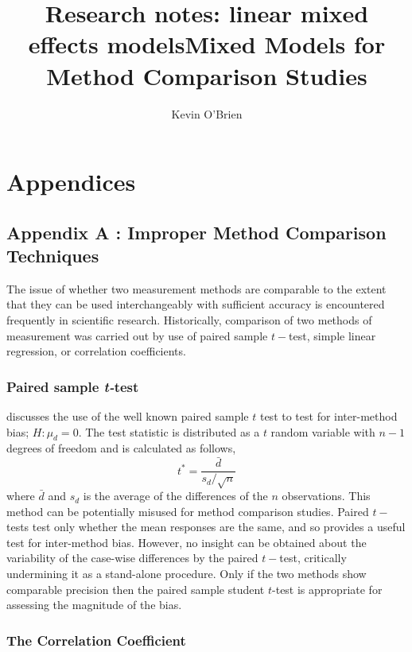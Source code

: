 \documentclass[12pt, a4paper]{report}
\title{Research notes: linear mixed effects models}
\author{ } \date{ }
\theoremstyle{plain}
\theoremstyle{definition}
\theoremstyle{remark}
\begin{document}
	\author{Kevin O'Brien}
	\title{Mixed Models for Method Comparison Studies}
	\tableofcontents
	
\chapter{Appendices}
\section{Appendix A : Improper Method Comparison Techniques}
	The issue of whether two measurement methods are comparable to the extent that they can be used interchangeably with sufficient accuracy is encountered frequently in scientific research. Historically, comparison of two methods of measurement was carried
	out by use of paired sample $t-$test, 
	simple linear regression, or correlation coefficients. 
	
	
	\subsection*{Paired sample \emph{t-}test}
	\citet{Bartko} discusses the use of the well known paired sample $t$ test to test for inter-method bias; $H: \mu_{d}=0$. The test
	statistic is distributed as a $t$ random variable with $n-1$ degrees of freedom and is calculated as follows,
	\begin{equation}
	t^{*} = \frac{\bar{d}}{ s_d/\sqrt{n}}
	\end{equation}
	where $\bar{d}$ and $s_{d}$ is the average of the differences of the $n$ observations. This method can be potentially misused for method comparison studies. Paired $t-$tests test only whether the mean responses are the same, and so provides a useful test for inter-method bias. However, no insight can be obtained about the variability of the case-wise differences by the paired $t-$test, critically undermining it as a stand-alone procedure. Only if the two methods show comparable
	precision then the paired sample student $t$-test is appropriate for assessing the magnitude of the bias.
	
	
	
	\subsection*{The Correlation Coefficient}
	
\end{document}
